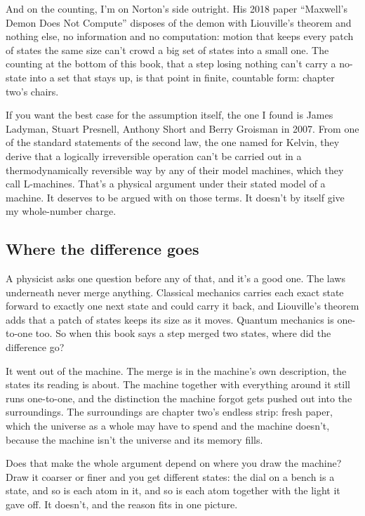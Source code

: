 \documentclass[11pt,twoside]{article}
\theoremstyle{thielethm}
\theoremstyle{thieledef}
\theoremstyle{thieledef}
\theoremstyle{thieledef}
\theoremstyle{thielethm}
\theoremstyle{thieleobs}
\theoremstyle{thielethm}
\begin{document}
And on the counting, I'm on Norton's side outright. His 2018 paper ``Maxwell's Demon Does Not Compute'' disposes of the demon with Liouville's theorem and nothing else, no information and no computation: motion that keeps every patch of states the same size can't crowd a big set of states into a small one. The counting at the bottom of this book, that a step losing nothing can't carry a no-state into a set that stays up, is that point in finite, countable form: chapter two's chairs.

If you want the best case for the assumption itself, the one I found is James Ladyman, Stuart Presnell, Anthony Short and Berry Groisman in 2007. From one of the standard statements of the second law, the one named for Kelvin, they derive that a logically irreversible operation can't be carried out in a thermodynamically reversible way by any of their model machines, which they call L-machines. That's a physical argument under their stated model of a machine. It deserves to be argued with on those terms. It doesn't by itself give my whole-number charge.

\subsection{Where the difference goes}

A physicist asks one question before any of that, and it's a good one. The laws underneath never merge anything. Classical mechanics carries each exact state forward to exactly one next state and could carry it back, and Liouville's theorem adds that a patch of states keeps its size as it moves. Quantum mechanics is one-to-one too. So when this book says a step merged two states, where did the difference go?

It went out of the machine. The merge is in the machine's own description, the states its reading is about. The machine together with everything around it still runs one-to-one, and the distinction the machine forgot gets pushed out into the surroundings. The surroundings are chapter two's endless strip: fresh paper, which the universe as a whole may have to spend and the machine doesn't, because the machine isn't the universe and its memory fills.

Does that make the whole argument depend on where you draw the machine? Draw it coarser or finer and you get different states: the dial on a bench is a state, and so is each atom in it, and so is each atom together with the light it gave off. It doesn't, and the reason fits in one picture.
\end{document}
